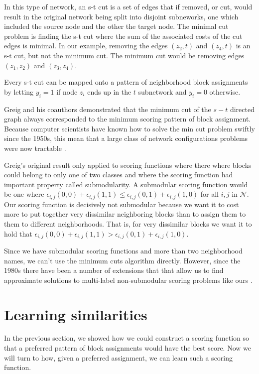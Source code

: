 In this type of network, an s-t cut is a set of edges that if removed,
or cut, would result in the original network being split into disjoint
subneworks, one which included the source node and the other the
target node. The minimal cut problem is finding the s-t cut where the
sum of the associated costs of the cut edges is minimal. In our
example, removing the edges $(z_2, t)$ and $(z_4, t)$ is an s-t cut,
but not the minimum cut. The minimum cut would be removing edges
$(z_1, z_2)$ and $(z_3, z_4)$.

Every s-t cut can be mapped onto a pattern of neighborhood block
assignments by letting $y_i = 1$ if node $z_i$ ends up in the $t$
subnetwork and $y_i = 0$ otherwise.

Greig and his coauthors demonstrated that the minimum cut of the $s-t$
directed graph always corresponded to the minimum scoring pattern of
block assignment. Because computer scientists have known how to solve
the min cut problem swiftly since the 1950s, this mean that a large
class of network configurations problems were now tractable \cite{ford_maximal_1956}.

Greig's original result only applied to scoring functions where there
where blocks could belong to only one of two classes and where the
scoring function had important property called submodularity.  A
submodular scoring function would be one where $\epsilon_{i,j}(0,0) +
\epsilon_{i,j}(1,1) \leq \epsilon_{i,j}(0,1) + \epsilon_{i,j}(1,0)$
for all $i,j$ in $\mathcal{N}$. Our scoring function is decisively not
submodular because we want it to cost more to put together very
dissimilar neighboring blocks than to assign them to them to different
neighborhoods. That is, for very dissimilar blocks we want it to hold
that $\epsilon_{i,j}(0,0) + \epsilon_{i,j}(1,1) \boldsymbol{>}
\epsilon_{i,j}(0,1) + \epsilon_{i,j}(1,0)$.

Since we have submodular scoring functions and more than two
neighborhood names, we can't use the minimum cuts algorithm
directly. However, since the 1980s there have been a number of
extensions that that allow us to find approximate solutions to
multi-label non-submodular scoring problems like ours \cite{something}.

\section*{Learning similarities}
In the previous section, we showed how we could construct a scoring
function so that a preferred pattern of block assignments would have
the best score. Now we will turn to how, given a preferred assignment,
we can learn such a scoring function. 

